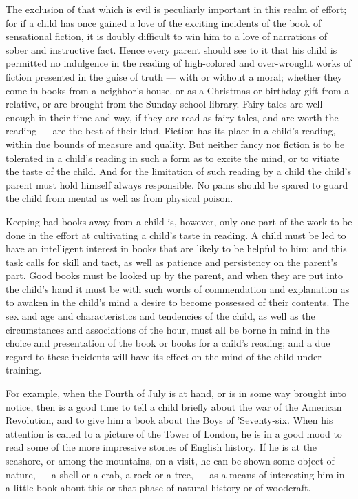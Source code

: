 \documentclass[
]{book}
\begin{document}
The exclusion of that which is evil is peculiarly important in this realm of effort; for if a child has once gained a love of the exciting incidents of the book of sensational fiction, it is doubly difficult to win him to a love of narrations of sober and instructive fact. Hence every parent should see to it that his child is permitted no indulgence in the reading of high-colored and over-wrought works of fiction presented in the guise of truth --- with or without a moral; whether they come in books from a neighbor's house, or as a Christmas or birthday gift from a relative, or are brought from the Sunday-school library. Fairy tales are well enough in their time and way, if they are read as fairy tales, and are worth the reading --- are the best of their kind. Fiction has its place in a child's reading, within due bounds of measure and quality. But neither fancy nor fiction is to be tolerated in a child's reading in such a form as to excite the mind, or to vitiate the taste of the child. And for the limitation of such reading by a child the child's parent must hold himself always responsible. No pains should be spared to guard the child from mental as well as from physical poison.

Keeping bad books away from a child is, however, only one part of the work to be done in the effort at cultivating a child's taste in reading. A child must be led to have an intelligent interest in books that are likely to be helpful to him; and this task calls for skill and tact, as well as patience and persistency on the parent's part. Good books must be looked up by the parent, and when they are put into the child's hand it must be with such words of commendation and explanation as to awaken in the child's mind a desire to become possessed of their contents. The sex and age and characteristics and tendencies of the child, as well as the circumstances and associations of the hour, must all be borne in mind in the choice and presentation of the book or books for a child's reading; and a due regard to these incidents will have its effect on the mind of the child under training.

For example, when the Fourth of July is at hand, or is in some way brought into notice, then is a good time to tell a child briefly about the war of the American Revolution, and to give him a book about the Boys of 'Seventy-six. When his attention is called to a picture of the Tower of London, he is in a good mood to read some of the more impressive stories of English history. If he is at the seashore, or among the mountains, on a visit, he can be shown some object of nature, --- a shell or a crab, a rock or a tree, --- as a means of interesting him in a little book about this or that phase of natural history or of woodcraft.
\end{document}

